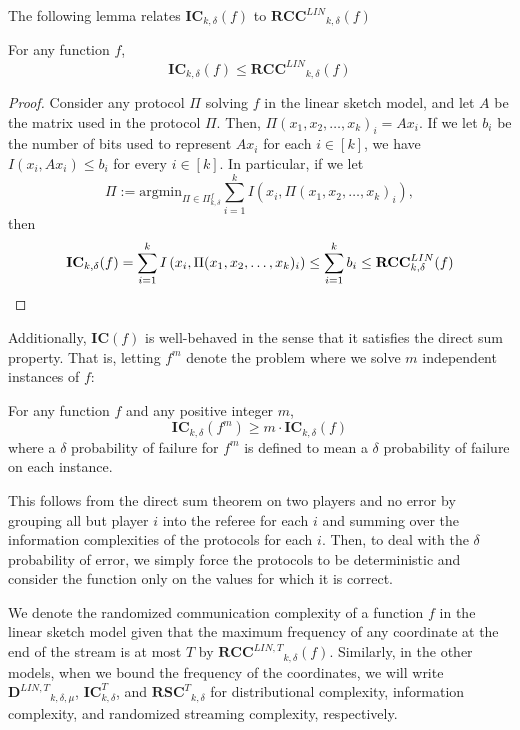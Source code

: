 \documentclass{toc}
\newcommand{\eqdef}{\ensuremath{:=}}
\newcommand{\rscT}{\ensuremath{\mathbf{RSC}^T}}
\newcommand{\ic}{\ensuremath{\mathbf{IC}}}
\newcommand{\rcclin}{\ensuremath{\mathbf{RCC}^{LIN}}}
\newcommand{\rcclinT}{\ensuremath{\mathbf{RCC}^{LIN,T}}}
\newcommand{\DlinT}{\ensuremath{\mathbf{D}^{LIN,T}}}
\begin{document}
{\color{black}
The following lemma relates $\ic_{k,\delta}(f)$ to $\rcclin_{k,\delta}(f)$
%
\begin{lemma}
For any function $f$,
    $$\ic_{k,\delta}(f) \le \rcclin_{k,\delta}(f)$$
\end{lemma}
\begin{proof}
    Consider any protocol $\Pi$ solving $f$ in the linear sketch model, and let $A$ be the matrix used in the protocol $\Pi$. Then, $\Pi(x_1, x_2, \dots, x_k)_i = Ax_i$. If we let $b_i$ be the number of bits used to represent $Ax_i$ for each $i \in [k]$, we have $I(x_i, Ax_i) \le b_i$ for every $i \in [k]$. In particular, if we let
    $$\Pi \eqdef \text{argmin}_{\Pi \in \Pi^f_{k,\delta}} \sum_{i=1}^k I\left(x_i, \Pi(x_1, x_2, \dots, x_k)_i\right),$$
    then
\begin{equation*}
  \ic_{k,\delta}(f) = \sum_{i=1}^k I\left(x_i, \Pi(x_1, x_2, \dots, x_k)_i\right) \le \sum_{i=1}^k b_i \le \rcclin_{k,\delta}(f) \qedhere
\end{equation*}
%
\end{proof}
}
Additionally, $\ic(f)$ is well-behaved in the sense that it satisfies the direct sum property. That is, letting $f^m$ denote the problem where we solve $m$ independent instances of $f$:

\begin{theorem}
For any function $f$ and any positive integer $m$,
$$\ic_{k,\delta}(f^m) \ge m \cdot \ic_{k,\delta}(f)$$
where a $\delta$ probability of failure for $f^m$ is defined to mean a $\delta$ probability of failure on each instance.
\end{theorem}
This follows from the direct sum theorem on two players and no error by grouping all but player $i$ into the referee for each $i$ and summing over the information complexities of the protocols for each $i$. Then, to deal with the $\delta$ probability of error, we simply force the protocols to be deterministic and consider the function only on the values for which it is correct.

We denote the randomized communication complexity of a function $f$ in the linear sketch model given that the maximum frequency of any coordinate at the end of the stream is at most $T$ by $\rcclinT_{k,\delta}(f)$. Similarly, in the other models, when we bound the frequency of the coordinates, we will write $\DlinT_{k,\delta,\mu}$, $\ic_{k,\delta}^T$, and $\rscT_{k,\delta}$ for distributional complexity, information complexity, and randomized streaming complexity, respectively.   %
%
%
\end{document}
